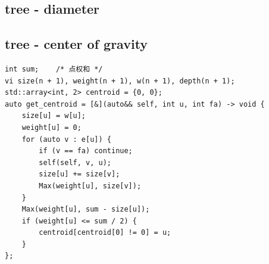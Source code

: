 \documentclass[UTF8, a4paper, titlepage, twoside]{ctexart}
\begin{document}
\subsection*{ tree - diameter }

\subsection{ tree - center of gravity }
\begin{lstlisting}[style=cpp]
int sum;    /* 点权和 */
vi size(n + 1), weight(n + 1), w(n + 1), depth(n + 1);
std::array<int, 2> centroid = {0, 0};
auto get_centroid = [&](auto&& self, int u, int fa) -> void {
    size[u] = w[u];
    weight[u] = 0;
    for (auto v : e[u]) {
        if (v == fa) continue;
        self(self, v, u);
        size[u] += size[v];
        Max(weight[u], size[v]);
    }
    Max(weight[u], sum - size[u]);
    if (weight[u] <= sum / 2) {
        centroid[centroid[0] != 0] = u;
    }
};
\end{lstlisting}
\end{document}
